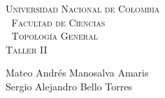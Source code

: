 \documentclass[11pt]{article}
\begin{document}
\setlength{\parindent}{0cm}
\hoffset-0.46cm
\voffset-1.46cm
\begin{window}
\large\scshape \hspace{1.4cm}\textsf{Universidad Nacional de Colombia} \\
\textcolor{white}{\tiny.}  \large \hspace{2.4cm} \textsf{Facultad de Ciencias} \\
\textcolor{white}{\tiny.}   \normalsize\hspace{2.8cm}\textsf{Topología General}\\
\hspace*{3.9cm}\textsf{Taller II}\\
\end{window}
\vspace{0.8cm}
\textsf{Mateo Andrés Manosalva Amaris\\
Sergio Alejandro Bello Torres} 
\normalsize
\dotfill
\vspace{0.7cm}


\begin{enumerate}
    
    
    
    
    
\end{enumerate}
\end{document}
